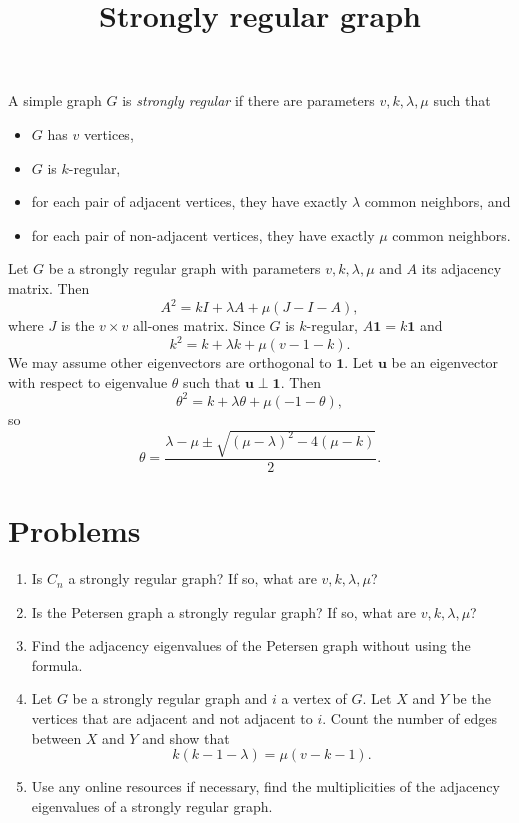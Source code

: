 \documentclass{article}
\title{Strongly regular graph}
\date{\vspace{-1cm}}
\newcommand{\bone}{\mathbf{1}}
\newcommand{\bu}{\mathbf{u}}
\theoremstyle{definition}
\begin{document}
\maketitle
\large

A simple graph $G$ is \emph{strongly regular} if there are parameters $v,k,\lambda,\mu$ such that \begin{itemize}
\item $G$ has $v$ vertices,
\item $G$ is $k$-regular, 
\item for each pair of adjacent vertices, they have exactly $\lambda$ common neighbors, and 
\item for each pair of non-adjacent vertices, they have exactly $\mu$ common neighbors.
\end{itemize}

Let $G$ be a strongly regular graph with parameters $v,k,\lambda,\mu$ and $A$ its adjacency matrix.  Then 
\[A^2 = kI + \lambda A + \mu(J - I - A),\]
where $J$ is the $v\times v$ all-ones matrix.
Since $G$ is $k$-regular, $A\bone = k\bone$ and 
\[k^2 = k + \lambda k + \mu(v - 1 - k).\]
We may assume other eigenvectors are orthogonal to $\bone$.  Let $\bu$ be an eigenvector with respect to eigenvalue $\theta$ such that $\bu\perp\bone$.  Then 
\[\theta^2 = k + \lambda\theta + \mu(-1 - \theta),\] 
so 
\[\theta = \frac{\lambda - \mu \pm \sqrt{(\mu - \lambda)^2 - 4(\mu - k)}}{2}.\]


\section*{Problems}
\begin{enumerate}
\setlength\itemsep{2em}
\item Is $C_n$ a strongly regular graph?  If so, what are $v,k,\lambda,\mu$?
\item Is the Petersen graph a strongly regular graph?  If so, what are $v,k,\lambda,\mu$?
\item Find the adjacency eigenvalues of the Petersen graph without using the formula.
\item Let $G$ be a strongly regular graph and $i$ a vertex of $G$.  Let $X$ and $Y$ be the vertices that are adjacent and not adjacent to $i$.  Count the number of edges between $X$ and $Y$ and show that
\[k(k - 1 - \lambda) = \mu(v - k - 1).\]
\item Use any online resources if necessary, find the multiplicities of the adjacency eigenvalues of a strongly regular graph.
\end{enumerate}

\end{document}
